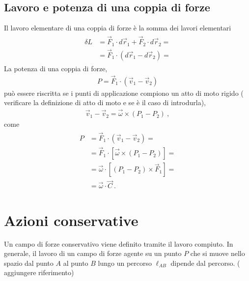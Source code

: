 \documentclass[letterpaper,10pt,italian]{jupyterBook}
\begin{document}
\subsection{Lavoro e potenza di una coppia di forze}
\label{\detokenize{ch/mechanics/actions-work:lavoro-e-potenza-di-una-coppia-di-forze}}
\sphinxAtStartPar
{} Il lavoro elementare di una coppia di forze è la somma dei lavori elementari
\begin{equation*}
\begin{split}\begin{aligned}
  \delta L & = \vec{F}_1 \cdot d \vec{r}_1 + \vec{F}_2 \cdot d \vec{r}_2 = \\
           & = \vec{F}_1 \cdot ( d \vec{r}_1 - d \vec{r}_2 ) = 
\end{aligned}\end{split}
\end{equation*}
\sphinxAtStartPar
{} La potenza di una coppia di forze,
\begin{equation*}
\begin{split}P = \vec{F}_1 \cdot (\vec{v}_1 - \vec{v}_2)\end{split}
\end{equation*}
\sphinxAtStartPar
può essere riscritta se i punti di applicazione compiono un atto di moto rigido ( verificare la definizione di atto di moto e se è il caso di introdurla),
\begin{equation*}
\begin{split}\vec{v}_1 - \vec{v}_2 = \vec{\omega} \times (P_1 - P_2) \ ,\end{split}
\end{equation*}
\sphinxAtStartPar
come
\begin{equation*}
\begin{split}\begin{aligned}
  P & =  \vec{F}_1 \cdot (\vec{v}_1 - \vec{v}_2) = \\
    & =  \vec{F}_1 \cdot \left[ \vec{\omega} \times (P_1 - P_2) \right] = \\
    & =  \vec{\omega} \cdot \left[ (P_1 - P_2) \times \vec{F}_1\right] = \\
    & =  \vec{\omega} \cdot \vec{C} \ . 
\end{aligned}\end{split}
\end{equation*}
\sphinxstepscope




\section{Azioni conservative}
\label{\detokenize{ch/mechanics/actions-conservative:azioni-conservative}}\label{\detokenize{ch/mechanics/actions-conservative:physics-hs-mechanics-actions-conservative}}\label{\detokenize{ch/mechanics/actions-conservative::doc}}
\sphinxAtStartPar
Un campo di forze conservativo viene definito tramite il lavoro compiuto. In generale, il lavoro di un campo di forze agente su un punto \(P\) che si muove nello spazio dal punto \(A\) al punto \(B\) lungo un percorso \(\ell_{AB}\) dipende dal percorso. ( aggiungere riferimento)
\end{document}
